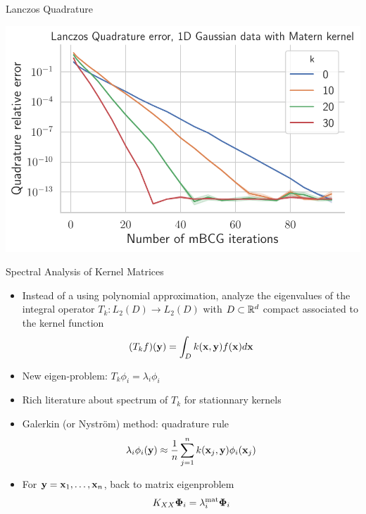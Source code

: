 \documentclass{beamer}
\begin{document}
\begin{frame}{Lanczos Quadrature}
\begin{center}
    \includegraphics[width=\textwidth]{report/res/quadrature_1d_gaussian_matern.pdf}
\end{center}
\end{frame}


\begin{frame}{Spectral Analysis of Kernel Matrices}
\begin{itemize}
    \item Instead of a using polynomial approximation, analyze the eigenvalues of the integral operator $T_k: L_2(D) \to L_2(D)$ with $D \subset \mathbb R^d$ compact associated to the kernel function
    \begin{equation*}
        (T_k f) (\boldsymbol{\mathbf{y}}) = \int_D k(\boldsymbol{\mathbf{x}}, \boldsymbol{\mathbf{y}}) f(\boldsymbol{\mathbf{x}}) d\boldsymbol{\mathbf{x}}
    \end{equation*}
    \item New eigen-problem: $T_k \phi_i = \lambda_i \phi_i$
    \item Rich literature about spectrum of $T_k$ for stationnary kernels
    \item Galerkin (or Nyström) method: quadrature rule
    \begin{equation*}
        \lambda_i \phi_i(\boldsymbol{\mathbf{y}}) \approx \frac{1}{n} \sum_{j=1}^n k(\boldsymbol{\mathbf{x}}_j, \boldsymbol{\mathbf{y}}) \phi_i(\boldsymbol{\mathbf{x}}_j)
    \end{equation*}
    \item For $\boldsymbol{\mathbf{y}} = \boldsymbol{\mathbf{x}}_1, \ldots, \boldsymbol{\mathbf{x}}_n$, back to matrix eigenproblem 
    \begin{equation*}
        K_{XX} \boldsymbol{\mathbf{\Phi}}_i = \lambda_i^\text{mat} \boldsymbol{\mathbf{\Phi}}_i
    \end{equation*}
\end{itemize}
\end{frame}
\end{document}

